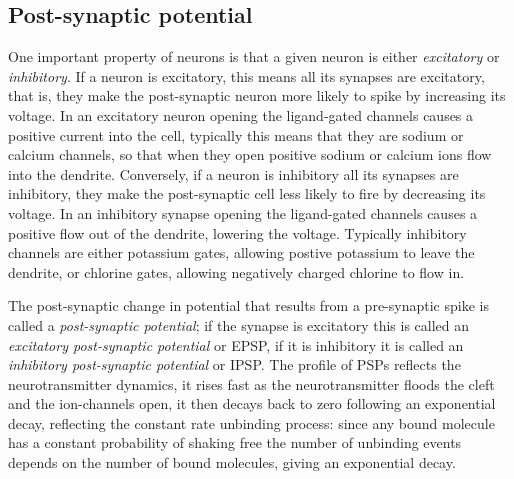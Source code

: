 \documentclass[11pt,a4paper]{scrartcl}
\begin{document}
\subsection*{Post-synaptic potential}

One important property of neurons is that a given neuron is either
\textsl{excitatory} or \textsl{inhibitory}. If a neuron is excitatory,
this means all its synapses are excitatory, that is, they make the
post-synaptic neuron more likely to spike by increasing its
voltage. In an excitatory neuron opening the ligand-gated channels
causes a positive current into the cell, typically this means that
they are sodium or calcium channels, so that when they open positive
sodium or calcium ions flow into the dendrite. Conversely, if a neuron
is inhibitory all its synapses are inhibitory, they make the
post-synaptic cell less likely to fire by decreasing its voltage. In
an inhibitory synapse opening the ligand-gated channels causes a
positive flow out of the dendrite, lowering the voltage. Typically
inhibitory channels are either potassium gates, allowing postive
potassium to leave the dendrite, or chlorine gates, allowing
negatively charged chlorine to flow in.

The post-synaptic change in potential that results from a pre-synaptic
spike is called a \textsl{post-synaptic potential}; if the synapse is
excitatory this is called an \textsl{excitatory post-synaptic
  potential} or EPSP, if it is inhibitory it is called an
\textsl{inhibitory post-synaptic potential} or IPSP. The profile of
PSPs reflects the neurotransmitter dynamics, it rises fast as the
neurotransmitter floods the cleft and the ion-channels open, it then
decays back to zero following an exponential decay, reflecting the
constant rate unbinding process: since any bound molecule has a
constant probability of shaking free the number of unbinding events
depends on the number of bound molecules, giving an exponential decay.
\end{document}
